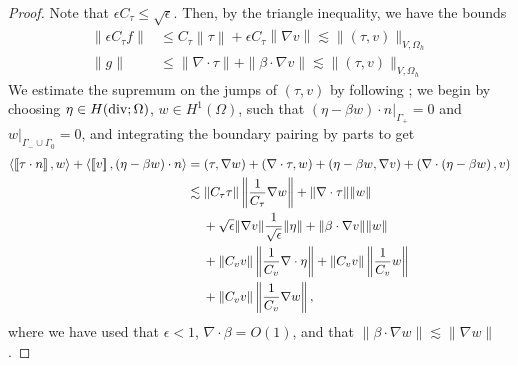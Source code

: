 \documentclass[11pt,onecolumn]{scrartcl}
\newcommand{\nor}[1]{\left\| #1 \right\|}
\newcommand{\LRs}[1]{\left[ #1 \right]}
\newcommand{\jump}[1] {\ensuremath{\LRs{\![#1]\!}}}
\newcommand{\Oh}{\Omega_h}
\newcommand{\grad}{\nabla}
\renewcommand{\div}{\grad \cdot}
\begin{document}
\begin{proof}
Note that $\epsilon C_\tau \leq \sqrt{\epsilon}$. Then, by the triangle inequality, we have the bounds
\begin{align*}
\|\epsilon C_\tau f \| &\leq C_\tau \nor{ \tau} + \epsilon C_\tau \nor{\grad v} \lesssim \| \left(\tau,v\right)\|_{V,\Oh}\\
\|g \| &\leq \|\div \tau\| +  \|\beta \cdot \grad v\| \lesssim \| \left(\tau,v\right)\|_{V,\Oh}
\end{align*}
We estimate the supremum on the jumps of $\left(\tau,v\right)$ by following \cite{DPGrobustness}; we begin by choosing $\eta \in H({\rm div}; \Omega)$, $w\in H^1(\Omega)$, such that $\left.\left(\eta-\beta w \right)\cdot n\right |_{\Gamma_+} = 0$ and $\left.w\right |_{\Gamma_-\cup\Gamma_0} = 0$, and integrating the boundary pairing by parts to get
\begin{align*}
\langle \jump{\tau\cdot n},w\rangle + \langle \jump{v},\left(\eta - \beta w\right)\cdot n\rangle &= (\tau,\grad w) + (\div \tau, w) + \left(\eta - \beta w, \grad v\right) +  \left(\div \left(\eta - \beta w\right), v\right)\\
&\lesssim \|C_\tau\tau\| \nor{ \frac{1}{C_\tau}\grad w} + \|\div \tau\| \|w\| \\
&\left.\hspace{.3cm}\right. + \sqrt{\epsilon}\| \grad v \|\frac{1}{\sqrt{\epsilon}}\|\eta\| +  \|\beta \cdot \grad v\| \| w\|\\
&\left.\hspace{.3cm}\right. + \|C_vv\|\nor{\frac{1}{C_v}\div \eta} + \| C_vv\| \nor{\frac{1}{C_v}w} \\
&\left.\hspace{.3cm}\right. + \|C_v v\| \nor{\frac{1}{C_v} \grad w},
\end{align*}
where we have used that $\epsilon < 1$, $\div \beta = O(1)$, and that $\|\beta\cdot \grad w\|\lesssim \|\grad w\|$.  


\end{proof}
\end{document}

